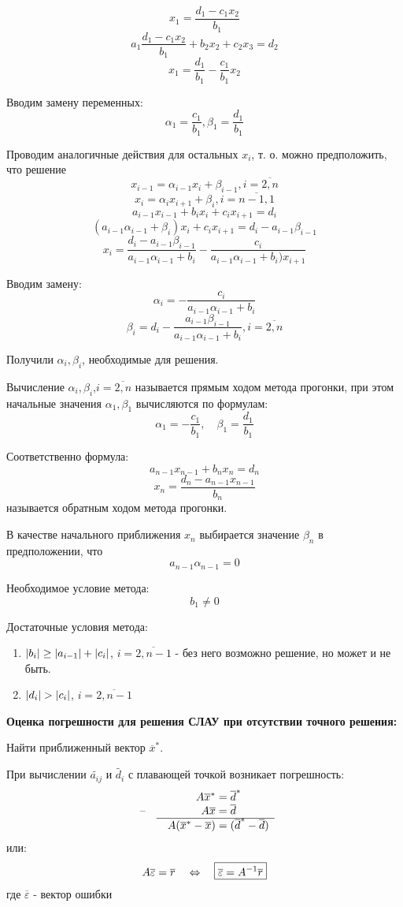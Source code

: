 \documentclass [12pt]{article}
\DeclarePairedDelimiter{\abs}{\lvert}{\rvert}
\begin{document}
$$ x_1=\frac{d_1-c_1x_2}{b_1} $$
$$ a_1\frac{d_1-c_1x_2}{b_1} +b_2x_2+c_2x_3=d_2 $$
$$ x_1= \frac{d_1}{b_1} -\frac{c_1}{b_1}x_2 $$

Вводим замену переменных:
$$ \alpha_1=\frac{c_1}{b_1},\beta_1=\frac{d_1}{b_1}  $$

Проводим аналогичные действия для остальных  $x_i$, т. о. можно предположить, что решение 
$$x_{i-1}=\alpha_{i-1}x_i+\beta_{i-1},i=\overline{2,n}$$
$$x_i=\alpha_ix_{i+1}+\beta_i,i=\overline{n-1,1}$$
$$a_{i-1}x_{i-1}+b_ix_i+c_ix_{i+1}=d_i$$
$$(a_{i-1}\alpha_{i-1}+\beta_i)x_i+c_ix_{i+1}=d_i-a_{i-1}\beta_{i-1}$$
$$x_i=\frac{d_i-a_{i-1}\beta_{i-1}}{a_{i-1}\alpha_{i-1}+ b_i}-\frac{c_i}{a_{i-1}\alpha_{i-1}+b_i)x_{i+1}}$$

Вводим замену:
$$\alpha_i=-\frac{c_i}{a_{i-1}\alpha_{i-1}+b_i} $$
$$ \beta_{i} = d_i -\frac{a_{i-1}\beta_{i-1}}{a_{i-1}\alpha_{i-1}+b_i},i=\overline{2,n} $$

Получили  $\alpha_i,\beta_i$, необходимые для решения.

Вычисление $\alpha_i,\beta_i$,$i=\overline{2,n}$ называется прямым ходом метода прогонки, при этом начальные значения $\alpha_1,\beta_1$ вычисляются по формулам:
$$ \alpha_1=-\frac{c_1}{b_1}, \quad \beta_1=\frac{d_1}{b_1}  $$


Соответственно формула: 
$$a_{n-1}x_{n-1}+b_nx_n=d_n$$
$$x_n=\frac{d_n-a_{n-1}x_{n-1}}{b_n}$$
называется обратным ходом метода прогонки.

В качестве начального приближения $x_n$ выбирается значение $\beta_n$ в предположении, что $$a_{n-1}\alpha_{n-1}= 0$$

Необходимое условие метода:
$$ b_1 \neq 0 $$

Достаточные условия метода:
\begin{enumerate}
\item $\abs{b_{i}} \geq \abs{a_{i-1}} + \abs{c_{i}} $, $i=\overline{2,n-1}$ - без него возможно решение, но может и не быть.
\item $\abs{d_{i}} >\abs{c_{i}} $, $i=\overline{2,n-1}$
\end{enumerate}

\textbf{Оценка погрешности для решения СЛАУ при отсутствии точного решения:}

Найти приближенный вектор $\overline{x}^*$.

При вычислении $\widetilde{a_{ij}}$ и $\widetilde{d_i}$ с плавающей точкой возникает погрешность:
\[
  \begin{array}{l@{\quad}cr@{}l}
    && A\overline{x}^* & {}= \overline{d}^* \\
    \text{--} && A\overline{x} & {}= \overline{d} \\ \cline{2-4}
    && A(\overline{x}^*-\overline{x}) & {}= (\overline{d}^*-\overline{d})
  \end{array}
\]
или:
$$
 A\overline{\varepsilon} = \overline{r} \\
  \quad
  \Leftrightarrow
  \quad 
   \boxed{\overline{\varepsilon} = A^{-1} \overline{r}} 
$$
где $ \overline{\varepsilon} $ - вектор ошибки
\end{document}
